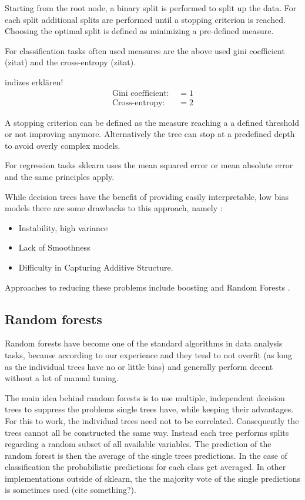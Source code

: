 Starting from the root node, a binary split is performed to
split up the data. For each split additional splits are performed
until a stopping criterion is reached.
Choosing the optimal split is defined as minimizing a
pre-defined measure.

For classification tasks often used measures
are the above used gini coefficient (zitat) and the
cross-entropy (zitat).

indizes erklären!
\begin{align}
	\text{Gini coefficient: } &= 1 \\
	\text{Cross-entropy: } &= 2
  \label{eq:03_gini_ce}
\end{align}

A stopping criterion can be defined as the measure reaching a
a defined threshold or not improving anymore.
Alternatively the tree can stop at a predefined depth to 
avoid overly complex models.

For regression tasks sklearn uses the mean squared error 
or mean absolute error and the same principles apply.

While decision trees have the benefit of providing
easily interpretable, low bias models there are some drawbacks to this
approach, namely \cite{hastie2017springer}:
\begin{itemize}
  \item{Instability, high variance}
  \item{Lack of Smoothness}
  \item{Difficulty in Capturing Additive Structure}.
\end{itemize}

Approaches to reducing these problems include
boosting \cite{freund1997decision} and Random Forests \cite{Breiman2001}.

\subsection{Random forests}

Random forests have become one of the standard algorithms
in data analysis tasks, because according to our
experience and \cite{hastie2017springer} they tend to
not overfit (as long as the individual trees have no or little bias)
and generally perform decent without a lot of manual tuning.

The main idea behind random forests is to use multiple, independent
decision trees to suppress the problems single trees have, while
keeping their advantages.
For this to work, the individual trees need not to be correlated.
Consequently the trees cannot all be constructed the same way.
Instead each tree performs splits regarding a random subset of all available variables.
The prediction of the random forest is then the average of
the single trees predictions.
In the case of classification the probabilistic predictions for each class
get averaged.
In other implementations outside of sklearn, the 
the majority vote of the single predictions
is sometimes used (cite something?).

